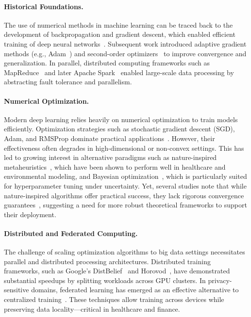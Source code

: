 \documentclass[acmsmall]{acmart}
\begin{document}
\paragraph{Historical Foundations.}
The use of numerical methods in machine learning can be traced back to the development of backpropagation and gradient descent, which enabled efficient training of 
deep neural networks~\citet{rumelhart1986learning}. Subsequent work introduced adaptive gradient methods (e.g., Adam~\citet{diederik2014adam}) and second-order optimizers~\citet{martens2010deep} 
to improve convergence and generalization. In parallel, distributed computing frameworks such as MapReduce~\citet{dean2012largemapreduce} and later Apache Spark~\citet{zaharia2010spark} enabled 
large-scale data processing by abstracting fault tolerance and parallelism.

\paragraph{Numerical Optimization.}
Modern deep learning relies heavily on numerical optimization to train models efficiently. Optimization strategies such as stochastic gradient descent (SGD), Adam, 
and RMSProp dominate practical applications~\citet{ruder2016overview}. However, their effectiveness often degrades in high-dimensional or non-convex settings. 
This has led to growing interest in alternative paradigms such as nature-inspired metaheuristics~\citet{Fong2023, Chen2016331, idrissi2016genetic}, which have been shown to perform well in 
healthcare and environmental modeling, and Bayesian optimization~\citet{snoek2012practical, klein2017fast}, which is particularly suited for hyperparameter tuning under uncertainty. 
Yet, several studies note that while nature-inspired algorithms offer practical success, they lack rigorous convergence guarantees~\citet{yang2020nature, zhou2021heuristic}, suggesting a need for more 
robust theoretical frameworks to support their deployment.

\paragraph{Distributed and Federated Computing.}
The challenge of scaling optimization algorithms to big data settings necessitates parallel and distributed processing architectures. Distributed training frameworks, 
such as Google's DistBelief~\citet{dean2012large} and Horovod~\citet{sergeev2018horovod}, have demonstrated substantial speedups by splitting workloads across GPU clusters. 
In privacy-sensitive domains, federated learning has emerged as an effective alternative to centralized training~\citet{mcmahan2017communication}. 
These techniques allow training across devices while preserving data locality—critical in healthcare and finance.
\end{document}
